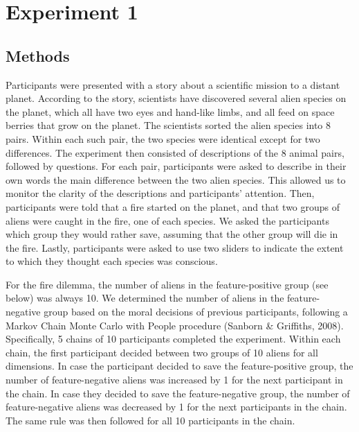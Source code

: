 \documentclass[10pt, letterpaper]{article}
\begin{document}
\hypertarget{experiment-1}{%
\section{Experiment 1}\label{experiment-1}}

\hypertarget{methods}{%
\subsection{Methods}\label{methods}}

Participants were presented with a story about a scientific mission to a
distant planet. According to the story, scientists have discovered
several alien species on the planet, which all have two eyes and
hand-like limbs, and all feed on space berries that grow on the planet.
The scientists sorted the alien species into 8 pairs. Within each such
pair, the two species were identical except for two differences. The
experiment then consisted of descriptions of the 8 animal pairs,
followed by questions. For each pair, participants were asked to
describe in their own words the main difference between the two alien
species. This allowed us to monitor the clarity of the descriptions and
participants' attention. Then, participants were told that a fire
started on the planet, and that two groups of aliens were caught in the
fire, one of each species. We asked the participants which group they
would rather save, assuming that the other group will die in the fire.
Lastly, participants were asked to use two sliders to indicate the
extent to which they thought each species was conscious.

For the fire dilemma, the number of aliens in the feature-positive group
(see below) was always 10. We determined the number of aliens in the
feature-negative group based on the moral decisions of previous
participants, following a Markov Chain Monte Carlo with People procedure
(Sanborn \& Griffiths, 2008). Specifically, 5 chains of 10 participants
completed the experiment. Within each chain, the first participant
decided between two groups of 10 aliens for all dimensions. In case the
participant decided to save the feature-positive group, the number of
feature-negative aliens was increased by 1 for the next participant in
the chain. In case they decided to save the feature-negative group, the
number of feature-negative aliens was decreased by 1 for the next
participants in the chain. The same rule was then followed for all 10
participants in the chain.
\end{document}
